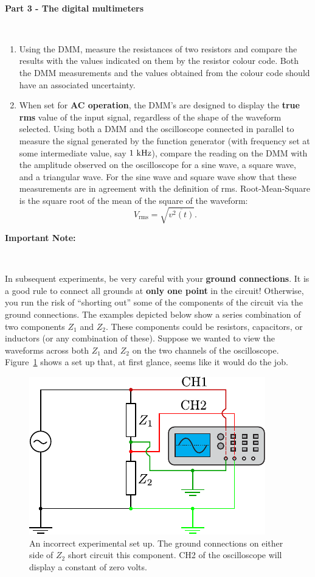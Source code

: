 \documentclass[12pt,oneside,openany,letterpaper]{article}
\begin{document}
~


{\bf Part 3 - The digital multimeters}

~

\begin{enumerate}[label=\alph*)]
\item Using the DMM, measure the resistances of two resistors and compare the results with the values indicated on them by the resistor colour code.  Both the DMM measurements and the values obtained from the colour code should have an associated uncertainty.
\item When set for {\bf AC operation}, the DMM’s are designed to display the {\bf true rms} value of the input signal, regardless of the shape of the waveform selected. Using both a DMM and the oscilloscope connected in parallel to measure the signal generated by the function generator (with frequency set at some intermediate value, say $1\rm\ kHz$), compare the reading on the DMM with the amplitude observed on the oscilloscope for a sine wave, a square wave, and a triangular wave. For the sine wave and square wave show that these measurements are in agreement with the definition of rms. Root-Mean-Square is the square root of the mean of the square of the waveform: 
\begin{equation}
V_\mathrm{rms} = \sqrt{\overline{v^2(t)}}.
\end{equation}
\end{enumerate}

\clearpage

{\bf Important Note:}

~

\noindent In subsequent experiments, be very careful with your {\bf ground connections}. It is a good rule to connect all grounds at {\bf only one point} in the circuit! Otherwise, you run the risk of ``shorting out'' some of the components of the circuit via the ground connections. The examples depicted below show a series combination of two components $Z_1$ and $Z_2$.  These components could be resistors, capacitors, or inductors (or any combination of these).  Suppose we wanted to view the waveforms across both $Z_1$ and $Z_2$ on the two channels of the oscilloscope.  Figure~\ref{fig:fig1} shows a set up that, at first glance, seems like it would do the job.
\begin{figure}[h!]
\begin{center}
\includegraphics[width=.5\textwidth]{figures/Lab1Fig1.pdf}\caption{\label{fig:fig1}An incorrect experimental set up.  The ground connections on either side of $Z_2$ short circuit this component.  CH2 of the oscilloscope will  display a constant of zero volts.}
\end{center}
\end{figure}
\end{document}
